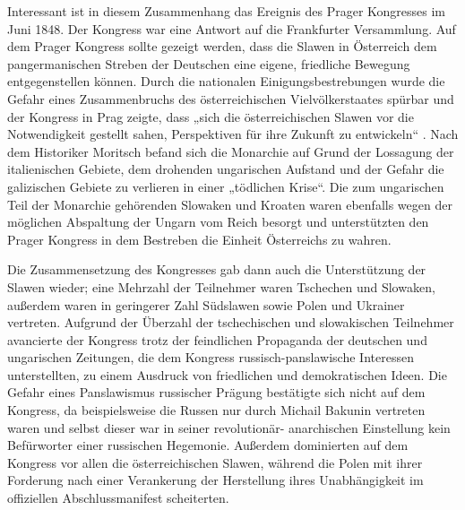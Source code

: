 \documentclass[12pt,headsepline,a4paper]{scrartcl}
\begin{document}
Interessant ist in diesem Zusammenhang das Ereignis des Prager Kongresses im Juni 1848.
Der Kongress war eine Antwort auf die Frankfurter Versammlung. Auf dem Prager Kongress
sollte gezeigt werden, dass die Slawen in Österreich dem pangermanischen Streben der
Deutschen eine eigene, friedliche Bewegung entgegenstellen können. Durch die nationalen
Einigungsbestrebungen wurde die Gefahr eines Zusammenbruchs des österreichischen
Vielvölkerstaates spürbar und der Kongress in Prag zeigte, dass „sich die österreichischen
Slawen vor die Notwendigkeit gestellt sahen, Perspektiven für ihre Zukunft zu entwickeln“\autocite[6]{moritsch}
. Nach dem Historiker Moritsch\autocite[7]{moritsch} befand sich die Monarchie auf Grund der
Lossagung der italienischen Gebiete, dem drohenden ungarischen Aufstand und der Gefahr
die galizischen Gebiete zu verlieren in einer „tödlichen Krise“. Die zum ungarischen Teil der
Monarchie gehörenden Slowaken und Kroaten waren ebenfalls wegen der möglichen
Abspaltung der Ungarn vom Reich besorgt und unterstützten den Prager Kongress in dem
Bestreben die Einheit Österreichs zu wahren.

Die Zusammensetzung des Kongresses gab dann auch die Unterstützung der Slawen wieder;
eine Mehrzahl der Teilnehmer waren Tschechen und Slowaken, außerdem waren in geringerer
Zahl Südslawen sowie Polen und Ukrainer vertreten.\autocite[17]{moritsch}
Aufgrund der Überzahl der tschechischen und slowakischen Teilnehmer avancierte der
Kongress trotz der feindlichen Propaganda der deutschen und ungarischen Zeitungen, die dem
Kongress russisch-panslawische Interessen unterstellten\autocite[69]{pokorny}, zu einem
Ausdruck von friedlichen und demokratischen Ideen. Die Gefahr eines Panslawismus
russischer Prägung bestätigte sich nicht auf dem Kongress, da beispielsweise die Russen nur
durch Michail Bakunin vertreten waren und selbst dieser war in seiner revolutionär-
anarchischen Einstellung kein Befürworter einer russischen Hegemonie. Außerdem
dominierten auf dem Kongress vor allen die österreichischen Slawen, während die Polen mit
ihrer Forderung nach einer Verankerung der Herstellung ihres Unabhängigkeit im offiziellen
Abschlussmanifest scheiterten.
\end{document}
